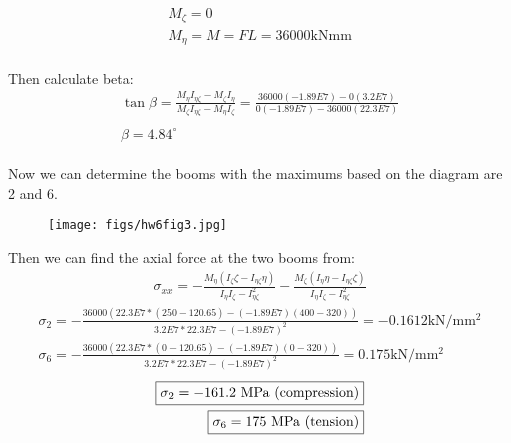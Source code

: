 \documentclass[12 pt]{article}
\begin{document}
\begin{align*}
    M_{\zeta}=0 \\
    M_{\eta}=M=FL=36000\textrm{kNmm}
\end{align*} \\
Then calculate beta:
\begin{align*}
    \tan{\beta}=\frac{M_{\eta}I_{\eta\zeta}-M_{\zeta}I_{\eta}}{M_{\zeta}I_{\eta\zeta}-M_{\eta}I_{\zeta}}
    =\frac{36000(-1.89E7)-0(3.2E7)}{0(-1.89E7)-36000(22.3E7)} \\ \\
    \beta=4.84^{\circ}
\end{align*} \\
Now we can determine the booms with the maximums based on the diagram are 2 and 6.
\begin{figure}[H]
    \centering
    \texttt{[image: figs/hw6fig3.jpg]}
\end{figure}
Then we can find the axial force at the two booms from:
\begin{align*}
    \sigma_{xx}=-\frac{M_{\eta}(I_{\zeta}\zeta-I_{\eta \zeta}\eta)}{I_{\eta}I_{\zeta}-I_{\eta \zeta}^2}
    -\frac{M_{\zeta}(I_{\eta}\eta - I_{\eta \zeta}\zeta)}{I_{\eta}I_{\zeta}-I_{\eta \zeta}^2}
\end{align*}
\begin{align*}
    \sigma_2=-\frac{36000(22.3E7*(250-120.65)-(-1.89E7)(400-320))}{3.2E7*22.3E7-(-1.89E7)^2}
    =-0.1612 \textrm{kN/mm$^2$} \\
    \sigma_6=-\frac{36000(22.3E7*(0-120.65)-(-1.89E7)(0-320))}{3.2E7*22.3E7-(-1.89E7)^2}
    =0.175 \textrm{kN/mm$^2$}
\end{align*}
\begin{align*}
    \fbox{$\sigma_2=-161.2$ MPa (compression)} \\
    \fbox{$\sigma_6=175$ MPa (tension)}
\end{align*}
\end{document}
